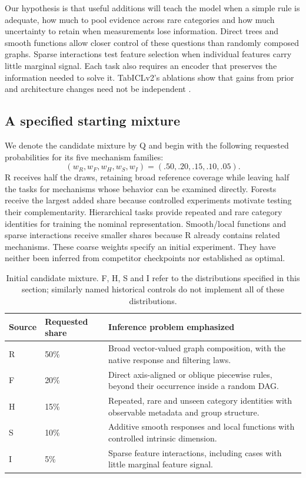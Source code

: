 \documentclass[11pt]{article}
\begin{document}
Our hypothesis is that useful additions will teach the model when a simple rule is adequate, how much to pool evidence across rare categories and how much uncertainty to retain when measurements lose information. Direct trees and smooth functions allow closer control of these questions than randomly composed graphs. Sparse interactions test feature selection when individual features carry little marginal signal. Each task also requires an encoder that preserves the information needed to solve it. TabICLv2's ablations show that gains from prior and architecture changes need not be independent \cite{tabicl2}.

\subsection{A specified starting mixture}

We denote the candidate mixture by Q and begin with the following requested probabilities for its five mechanism families:
\[
 (w_R,w_F,w_H,w_S,w_I)=(.50,.20,.15,.10,.05).
\]
R receives half the draws, retaining broad reference coverage while leaving half the tasks for mechanisms whose behavior can be examined directly. Forests receive the largest added share because controlled experiments motivate testing their complementarity. Hierarchical tasks provide repeated and rare category identities for training the nominal representation. Smooth/local functions and sparse interactions receive smaller shares because R already contains related mechanisms. These coarse weights specify an initial experiment. They have neither been inferred from competitor checkpoints nor established as optimal.

\begin{table}[ht]
\centering\small
\begin{tabularx}{\linewidth}{@{}p{.10\linewidth}p{.12\linewidth}Y@{}}
\toprule Source & Requested share & Inference problem emphasized\\\midrule
R & 50\% & Broad vector-valued graph composition, with the native response and filtering laws.\\
F & 20\% & Direct axis-aligned or oblique piecewise rules, beyond their occurrence inside a random DAG.\\
H & 15\% & Repeated, rare and unseen category identities with observable metadata and group structure.\\
S & 10\% & Additive smooth responses and local functions with controlled intrinsic dimension.\\
I & 5\% & Sparse feature interactions, including cases with little marginal feature signal.\\\bottomrule
\end{tabularx}
\caption{Initial candidate mixture. F, H, S and I refer to the distributions specified in this section; similarly named historical controls do not implement all of these distributions.}
\end{table}
\end{document}

